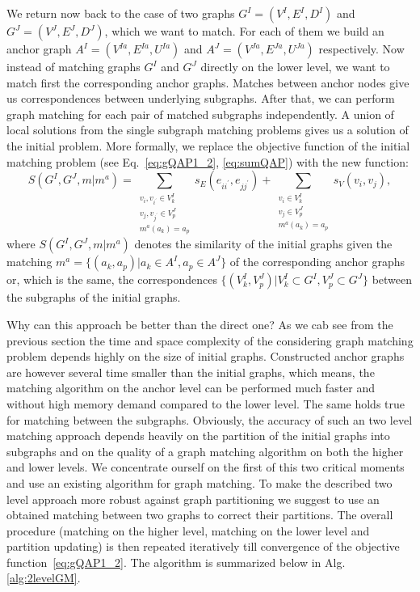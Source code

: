 We return now back to the case of two graphs $G^I=(V^I,E^I,D^I)$ and $G^J=(V^J,E^J,D^J)$, which we want to match. 
For each of them we build an anchor graph $A^I=(V^{Ia},E^{Ia},U^{Ia})$ and $A^J=(V^{Ja},E^{Ja},U^{Ja})$ respectively.
Now instead of matching graphs $G^I$ and $G^J$ directly on the lower level, we want to match first the corresponding anchor graphs. Matches between anchor nodes give us correspondences between underlying subgraphs. After that, we can perform graph matching for each pair of matched subgraphs independently. A union of local solutions from the single subgraph matching problems gives us a solution of the initial problem. More formally, we replace the objective function of the initial matching problem (see Eq.~\eqref{eq:gQAP1_2}, \eqref{eq:sumQAP}) with the new function:
\begin{equation}\label{eq:sumQAP_2}
	S(G^I,G^J,m|m^a)=\sum_{\substack{ v_{i},v_{i^\prime}\in V^I_k\\v_{j},v_{j^\prime}\in V^J_p\\ m^a(a_k)=a_p}}s_E(e_{ii^\prime},e_{jj^\prime}) + \sum_{\substack{ v_{i}\in V^I_k\\v_{j}\in V^J_p\\ m^a(a_k)=a_p}}s_V(v_{i},v_{j}),
\end{equation}
where $S(G^I,G^J,m|m^a)$ denotes the similarity of the initial graphs given the matching $m^a=\{(a_k,a_p)|a_k\in A^I,a_p\in A^J\}$ of the corresponding anchor graphs or, which is the same, the correspondences $\{(V^ I_k,V^J_p)|V^I_k\subset G^I,V^J_p\subset G^J\}$ between the subgraphs of the initial graphs.

Why can this approach be better than the direct one? As we cab see from the previous section the time and space complexity of the considering graph matching problem depends highly on the size of initial graphs. Constructed anchor graphs are however several time smaller than the initial graphs, which means, the matching algorithm on the anchor level can be performed much faster and without high memory demand compared to the lower level. The same holds true for matching between the subgraphs.
Obviously, the accuracy of such an two level matching approach depends heavily on the partition of the initial graphs into subgraphs and on the quality of a graph matching algorithm on both the higher and lower levels. We concentrate ourself on the first of this two critical moments and use an existing algorithm for graph matching. To make the described two level approach more robust against graph partitioning we suggest to use an obtained matching between two graphs to correct their partitions. The overall procedure (matching on the higher level, matching on the lower level and partition updating) is then repeated iteratively till convergence of the objective function~\eqref{eq:gQAP1_2}. The algorithm is summarized below in Alg.\ref{alg:2levelGM}.

